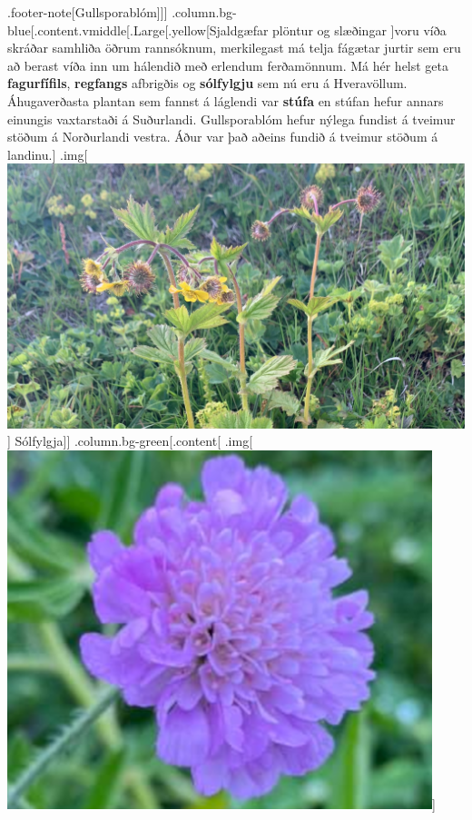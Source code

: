 \documentclass[
]{article}
\begin{document}
.footer-note{[}Gullsporablóm{]}{]}{]}
.column.bg-blue{[}.content.vmiddle{[}.Large{[}.yellow{[}Sjaldgæfar
plöntur og slæðingar {]}voru víða skráðar samhliða öðrum rannsóknum,
merkilegast má telja fágætar jurtir sem eru að berast víða inn um
hálendið með erlendum ferðamönnum. Má hér helst geta
\textbf{fagurfífils}, \textbf{regfangs} afbrigðis og \textbf{sólfylgju}
sem nú eru á Hveravöllum. Áhugaverðasta plantan sem fannst á láglendi
var \textbf{stúfa} en stúfan hefur annars einungis vaxtarstaði á
Suðurlandi. Gullsporablóm hefur nýlega fundist á tveimur stöðum á
Norðurlandi vestra. Áður var það aðeins fundið á tveimur stöðum á
landinu.{]} .img{[}\includegraphics{myndir/solfyglja.JPEG}{]}
Sólfylgja{]}{]} .column.bg-green{[}.content{[}
.img{[}\includegraphics{myndir/stufa.png}{]}\\
\end{document}
